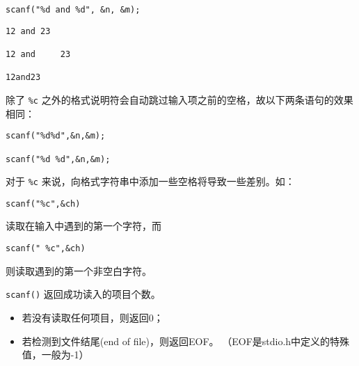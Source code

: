\begin{frame}[fragile]
\begin{lstlisting}[showspaces=true,backgroundcolor=\color{red!20}]
scanf("%d and %d", &n, &m);
\end{lstlisting}
\pause 
\begin{lstlisting}[title=合法的输入方式,showspaces=true,backgroundcolor=\color{red!20}]
12 and 23

12 and     23

12and23
\end{lstlisting}
\end{frame}

\begin{frame}[fragile]

除了 \lstinline|%c| 之外的格式说明符会自动跳过输入项之前的空格，故以下两条语句的效果相同：
\begin{lstlisting}[showspaces=true,backgroundcolor=\color{red!20}]
scanf("%d%d",&n,&m);

scanf("%d %d",&n,&m);
\end{lstlisting}
\end{frame}

\begin{frame}[fragile]
对于 \lstinline|%c| 来说，向格式字符串中添加一些空格将导致一些差别。如：
\begin{lstlisting}[showspaces=true,backgroundcolor=\color{red!10}]
scanf("%c",&ch)
\end{lstlisting}
读取在输入中遇到的第一个字符，而
\begin{lstlisting}[showspaces=true,backgroundcolor=\color{red!10}]
scanf(" %c",&ch)
\end{lstlisting}
则读取遇到的第一个非空白字符。
\end{frame}

\begin{frame}[fragile]
  \lstinline|scanf()| 返回成功读入的项目个数。

\begin{itemize}
\item
 若没有读取任何项目，则返回0；
\item
若检测到文件结尾(end of file)，则返回EOF。
（EOF是stdio.h中定义的特殊值，一般为-1）
\end{itemize}

\end{frame}


